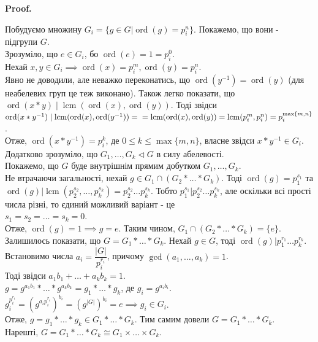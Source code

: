 \documentclass[a4paper, 10pt]{article}
\makeatletter
\theoremstyle{theoremdd}
\theoremstyle{theoremdd}
\theoremstyle{theoremdd}
\theoremstyle{theoremdd}
\theoremstyle{theoremdd}
\theoremstyle{theoremdd}
\theoremstyle{theoremdd}
\theoremstyle{theoremdd}
\theoremstyle{theoremdd}
\theoremstyle{theoremdd}
\theoremstyle{theoremdd}
\theoremstyle{theoremdd}
\theoremstyle{theoremdd}
\theoremstyle{theoremdd}
\theoremstyle{theoremdd}
\renewenvironment{proof}[1][Proof.\\]{\par
\pushQED{\hfill \qed}%
\normalfont \topsep6\p@\@plus6\p@\relax
\trivlist
\item\relax
{\bfseries
#1\@addpunct{.}}\hspace\labelsep\ignorespaces
}{%
\popQED\endtrivlist\@endpefalse
}
\DeclareMathOperator{\ord}{ord}
\DeclareMathOperator{\lcm}{lcm}
\makeatother
\begin{document}
\begin{proof}
Побудуємо множину $G_i = \{g \in G | \ord(g) = p_i^n\}$. Покажемо, що вони - підгрупи $G$.\\
Зрозуміло, що $e \in G_i$, бо $\ord(e) = 1 = p_i^0$.\\
Нехай $x,y \in G_i \implies \ord(x) = p_i^{m}, \ord(y) = p_i^n$.\\
Явно не доводили, але неважко переконатись, що $\ord(y^{-1}) = \ord(y)$ (для неабелевих груп це теж виконано). Також легко показати, що \\
$\ord(x*y) \mid \lcm(\ord(x), \ord(y))$. Тоді звідси\\
$\ord(x*y^{-1}) \mid \lcm(\ord(x), \ord(y^{-1})) = \\ =\lcm(\ord(x),\ord(y)) = \lcm(p_i^m,p_i^n) = p_i^{\max\{m,n\}}$.\\
Отже, $\ord(x*y^{-1}) = p_i^{k}$, де $0 \leq k \leq \max\{m,n\}$, власне звідси $x*y^{-1} \in G_i$.\\
Додатково зрозуміло, що $G_1,\dots,G_k \triangleleft G$ в силу абелевості.
\bigskip \\
Покажемо, що $G$ буде внутрішнім прямим добутком $G_1,\dots,G_k$.\\
Не втрачаючи загальності, нехай $g \in G_1 \cap (G_2*\dots*G_k)$. Тоді $\ord(g) = p_1^{s_1}$ та $\ord(g) | \lcm(p_2^{s_2},\dots,p_k^{s_k}) = p_2^{s_2} \dots p_k^{s_k}$. Тобто $p_1^{s_1} | p_2^{s_2} \dots p_k^{s_k}$, але оскільки всі прості числа різні, то єдиний можливий варіант - це \\
$s_1 = s_2 = \dots = s_k = 0$.\\
Отже, $\ord(g) = 1 \implies g = e$. Таким чином, $G_1 \cap (G_2*\dots*G_k) = \{e\}$.\\
Залишилось показати, що $G = G_1 * \dots * G_k$. Нехай $g \in G$, тоді $\ord(g) | p_1^{r_1} \dots p_k^{r_k}$.\\
Встановимо числа $a_i = \dfrac{|G|}{p_i^{r_i}}$, причому $\gcd(a_1,\dots,a_k) = 1$.\\
Тоді звідси $a_1b_1 + \dots + a_kb_k = 1$.\\
$g = g^{a_1b_1} * \dots * g^{a_kb_k} = g_1 * \dots * g_k$, де $g_i = g^{a_ib_i}$.\\
$g_i^{p_i^{r_i}} = (g^{a_ip_i^{r_i}})^{b_i} = (g^{|G|})^{b_i} = e \implies g_i \in G_i$.\\
Отже, $g = g_1*\dots*g_k \in G_1*\dots*G_k$. Тим самим довели $G = G_1*\dots*G_k$.\\
Нарешті, $G = G_1*\dots*G_k \cong G_1 \times \dots \times G_k$.
\end{proof}
\end{document}
